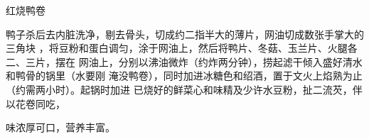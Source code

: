 \begin{recipe}{红烧鸭卷}

\ingredients


\cooking

鸭子杀后去内脏洗净，剔去骨头，切成约二指半大的薄片，网油切成数张手掌大的三角块
，将豆粉和蛋白调匀，涂于网油上，然后将鸭片、冬菇、玉兰片、火腿各二、三片，摆在
网油上，分别以沸油微炸（约炸两分钟），捞起滤干倾入盛好清水和鸭骨的锅里（水要刚
淹没鸭卷），同时加进冰糖色和绍酒，置于文火上焰熟为止（约需两小时）。起锅时加进
已烧好的鲜菜心和味精及少许水豆粉，扯二流芡，伴以花卷同吃，

\features

味浓厚可口，营养丰富。

\end{recipe}

